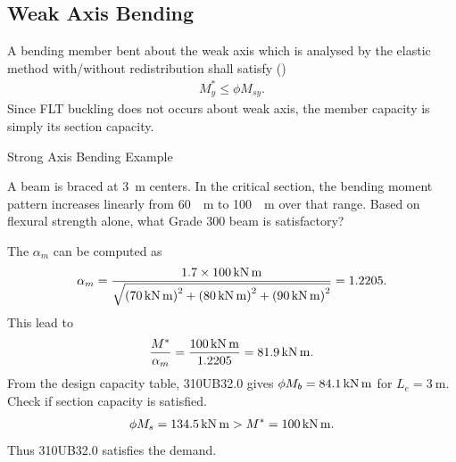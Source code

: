 \subsection{Weak Axis Bending}
A bending member bent about the weak axis which is analysed by the elastic method with/without redistribution shall satisfy ()
\begin{gather}
M^*_y\leqslant\phi{}M_{sy}.
\end{gather}
Since FLT buckling does not occurs about weak axis, the member capacity is simply its section capacity.
\begin{exmp}
Strong Axis Bending Example

A beam is braced at \SI{3}{\meter} centers. In the critical section, the bending moment pattern increases linearly from \SI{60}{\kn\meter} to \SI{100}{\kn\meter} over that range. Based on flexural strength alone, what Grade 300 beam is satisfactory?
\begin{figure}[H]

\end{figure}
\end{exmp}
\begin{solution}
The $\alpha_m$ can be computed as
\begin{gather*}
\alpha_m=\dfrac{1.7\times\SI{100}{\kilo\newton\meter}}{\sqrt{\left(\SI{70}{\kilo\newton\meter}\right)^2+\left(\SI{80}{\kilo\newton\meter}\right)^2+\left(\SI{90}{\kilo\newton\meter}\right)^2}}=1.2205.
\end{gather*}
This lead to
\begin{gather*}
\dfrac{M^*}{\alpha_m}=\dfrac{\SI{100}{\kilo\newton\meter}}{1.2205}=\SI{81.9}{\kilo\newton\meter}.
\end{gather*}
From the design capacity table, 310UB32.0 gives $\phi{}M_b=\SI{84.1}{\kilo\newton\meter}$ for $L_e=\SI{3}{\meter}$. Check if section capacity is satisfied.
\begin{gather*}
\phi{}M_s=\SI{134.5}{\kilo\newton\meter}>M^*=\SI{100}{\kilo\newton\meter}.
\end{gather*}
Thus 310UB32.0 satisfies the demand.
\end{solution}

